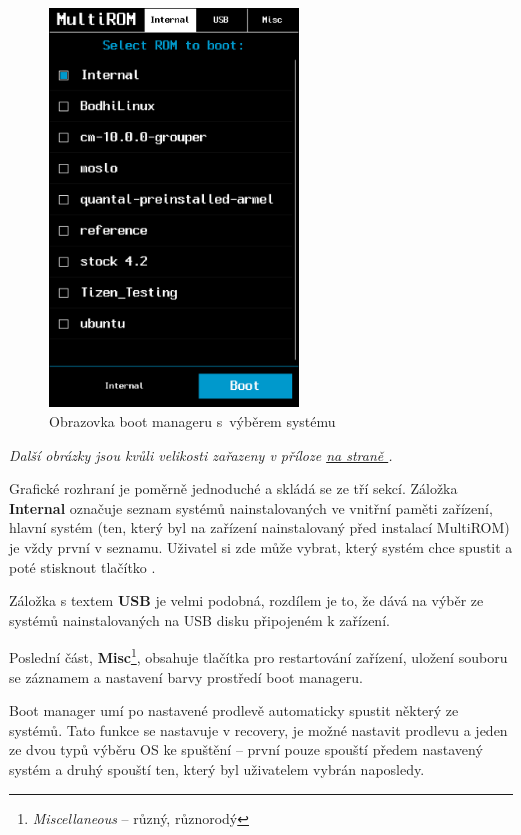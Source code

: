 \documentclass[12pt, a4paper, oneside]{article}
\newcommand{\B}{\textbf} %
\newcommand{\It}{\textit}  %
\newcommand*{\attref}[1]{\hyperref[{#1}]{\uv{\nameref*{#1}} na straně \pageref{#1}}}
\begin{document}
\begin{figure}[H]
\begin{center}
 \includegraphics[width=250px]{img/boot_manager.png}
\caption{Obrazovka boot manageru s~výběrem systému}
\end{center}
\end{figure}
\vspace{-20pt}
\noindent \It{Další obrázky jsou kvůli velikosti zařazeny v příloze \attref{obrazky}.}

Grafické rozhraní je poměrně jednoduché a skládá se ze tří sekcí. Záložka \B{Internal} označuje seznam systémů nainstalovaných ve vnitřní paměti zařízení, hlavní systém (ten, který byl na zařízení nainstalovaný před instalací MultiROM) je vždy první v seznamu. Uživatel si zde může vybrat, který systém chce spustit a poté stisknout tlačítko .

Záložka s textem \B{USB} je velmi podobná, rozdílem je to, že dává na výběr ze systémů nainstalovaných na USB disku připojeném k zařízení.

Poslední část, \B{Misc}\footnote{\It{Miscellaneous} -- různý, různorodý}, obsahuje tlačítka pro restartování zařízení, uložení souboru se záznamem a nastavení barvy prostředí boot manageru.

Boot manager umí po nastavené prodlevě automaticky spustit některý ze systémů. Tato funkce se nastavuje v recovery, je možné nastavit prodlevu a jeden ze dvou typů výběru OS ke spuštění -- první pouze spouští předem nastavený systém a druhý spouští ten, který byl uživatelem vybrán naposledy.
\end{document}
